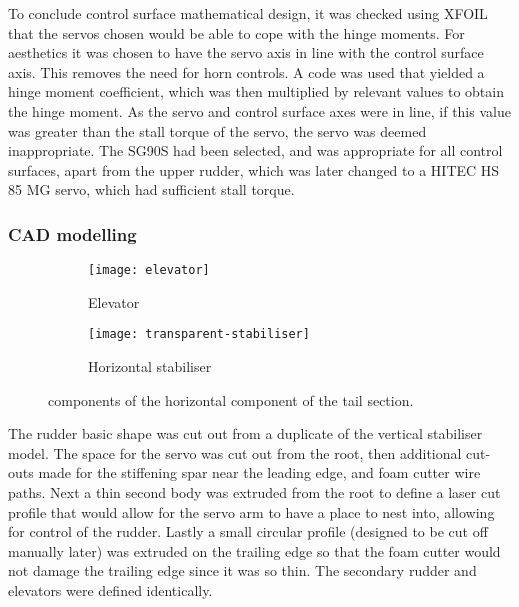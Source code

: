 \documentclass[../../main.tex]{subfiles}
\begin{document}
To conclude control surface mathematical design, it was checked using XFOIL that the servos chosen would be able to cope with the hinge moments.
For aesthetics it was chosen to have the servo axis in line with the control surface axis.
This removes the need for horn controls.
A code was used that yielded a hinge moment coefficient, which was then multiplied by relevant values to obtain the hinge moment.
As the servo and control surface axes were in line, if this value was greater than the stall torque of the servo, the servo was deemed inappropriate.
The SG90S had been selected, and was appropriate for all control surfaces, apart from the upper rudder, which was later changed to a HITEC HS 85 MG servo, which had sufficient stall torque. 

\subsubsection{CAD modelling} \label{sec:design-process:final-design-proposal:control-surfaces:cad-modelling}


\begin{figure}[H]

    \centering
    \begin{subfigure}[b]{0.49\columnwidth}
        \centering
        \texttt{[image: elevator]}
        \caption{Elevator}
        \label{fig:tail-assembly:elevator}
    \end{subfigure}
    \hfill
    \begin{subfigure}[b]{0.49\columnwidth}
        \centering
        \texttt{[image: transparent-stabiliser]}
        \caption{Horizontal stabiliser}
        \label{fig:tail-assembly:horizontal-stabiliser}
    \end{subfigure}
    
    \caption{components of the horizontal component of the tail section.}
    \label{fig:tail-assembly}
\end{figure} 

The rudder basic shape was cut out from a duplicate of the vertical stabiliser model.
The space for the servo was cut out from the root, then additional cut-outs made for the stiffening spar near the leading edge, and foam cutter wire paths.
Next a thin second body was extruded from the root to define a laser cut profile that would allow for the servo arm to have a place to nest into, allowing for control of the rudder.
Lastly a small circular profile (designed to be cut off manually later) was extruded on the trailing edge so that the foam cutter would not damage the trailing edge since it was so thin.
The secondary rudder and elevators were defined identically. 
\end{document}
